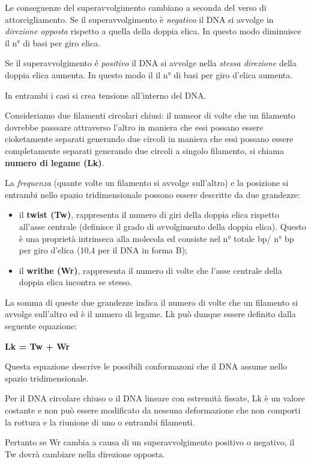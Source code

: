 \documentclass[11pt]{book}
\begin{document}
Le conseguenze del superavvolgimento cambiano a seconda del verso di
attorcigliamento. Se il superavvolgimento è \emph{negativo} il DNA si
avvolge in \emph{direzione opposta} rispetto a quella della doppia
elica. In questo modo diminuisce il n° di basi per giro elica.

Se il superavvolgimento é \emph{positivo} il DNA si avvolge nella
\emph{stessa direzione} della doppia elica aumenta. In questo modo il il
n° di basi per giro d'elica aumenta.

In entrambi i casi si crea tensione all'interno del DNA.

Consideriamo due filamenti circolari chiusi: il numeor di volte che un
filamento dovrebbe passsare attraverso l'altro in maniera che essi
possano essere cioketamente separati generando due circoli in maniera
che essi possano essere completamente separati generando due circoli a
singolo filamento, si chiama \textbf{numero di legame (Lk)}.

La \emph{frequenza} (quante volte un filamento si avvolge sull'altro) e
la posizione si entrambi nello spazio tridimensionale possono essere
descritte da due grandezze:

\begin{itemize}
\itemsep1pt\parskip0pt
\item
  il \textbf{twist (Tw)}, rappresenta il numero di giri della doppia
  elica rispetto all'asse centrale (definisce il grado di avvolgimento
  della doppia elica). Questo è una proprietà intrinseca alla molecola
  ed consiste nel n° totale bp/ n° bp per giro d'elica (10,4 per il DNA
  in forma B);
\item
  il \textbf{writhe (Wr)}, rappresenta il numero di volte che l'asse
  centrale della doppia elica incontra se stesso.
\end{itemize}

La somma di queste due grandezze indica il numero di volte che un
filamento si avvolge sull'altro ed è il numero di legame. Lk può dunque
essere definito dalla seguente equazione:

\textbf{Lk = Tw + Wr}

Questa equazione descrive le possibili conformazoni che il DNA assume
nello spazio tridimensionale.

Per il DNA circolare chiuso o il DNA lineare con estremità fissate, Lk è
un valore costante e non può essere modificato da nessuna deformazione
che non comporti la rottura e la riunione di uno o entrambi filamenti.

Pertanto se Wr cambia a causa di un superavvolgimento positivo o
negativo, il Tw dovrà cambiare nella direzione opposta.
\end{document}
